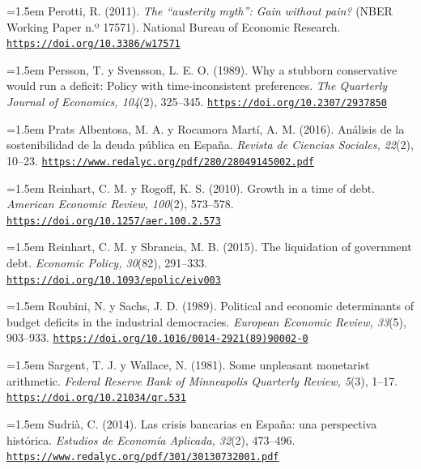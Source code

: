 \documentclass[10pt,a4paper]{article}
\begin{document}
\noindent\hangindent=1.5em Perotti, R. (2011). \textit{The ``austerity myth'': Gain without pain?} (NBER Working Paper n.º 17571). National Bureau of Economic Research. \href{https://doi.org/10.3386/w17571}{\nolinkurl{https://doi.org/10.3386/w17571}}

\noindent\hangindent=1.5em Persson, T. y Svensson, L. E. O. (1989). Why a stubborn conservative would run a deficit: Policy with time-inconsistent preferences. \textit{The Quarterly Journal of Economics, 104}(2), 325--345. \href{https://doi.org/10.2307/2937850}{\nolinkurl{https://doi.org/10.2307/2937850}}

\noindent\hangindent=1.5em Prats Albentosa, M. A. y Rocamora Martí, A. M. (2016). Análisis de la sostenibilidad de la deuda pública en España. \textit{Revista de Ciencias Sociales, 22}(2), 10--23. \href{https://www.redalyc.org/pdf/280/28049145002.pdf}{\nolinkurl{https://www.redalyc.org/pdf/280/28049145002.pdf}}

\noindent\hangindent=1.5em Reinhart, C. M. y Rogoff, K. S. (2010). Growth in a time of debt. \textit{American Economic Review, 100}(2), 573--578. \href{https://doi.org/10.1257/aer.100.2.573}{\nolinkurl{https://doi.org/10.1257/aer.100.2.573}}

\noindent\hangindent=1.5em Reinhart, C. M. y Sbrancia, M. B. (2015). The liquidation of government debt. \textit{Economic Policy, 30}(82), 291--333. \href{https://doi.org/10.1093/epolic/eiv003}{\nolinkurl{https://doi.org/10.1093/epolic/eiv003}}

\noindent\hangindent=1.5em Roubini, N. y Sachs, J. D. (1989). Political and economic determinants of budget deficits in the industrial democracies. \textit{European Economic Review, 33}(5), 903--933. \href{https://doi.org/10.1016/0014-2921(89)90002-0}{\nolinkurl{https://doi.org/10.1016/0014-2921(89)90002-0}}

\noindent\hangindent=1.5em Sargent, T. J. y Wallace, N. (1981). Some unpleasant monetarist arithmetic. \textit{Federal Reserve Bank of Minneapolis Quarterly Review, 5}(3), 1--17. \href{https://doi.org/10.21034/qr.531}{\nolinkurl{https://doi.org/10.21034/qr.531}}

\noindent\hangindent=1.5em Sudrià, C. (2014). Las crisis bancarias en España: una perspectiva histórica. \textit{Estudios de Economía Aplicada, 32}(2), 473--496. \href{https://www.redalyc.org/pdf/301/30130732001.pdf}{\nolinkurl{https://www.redalyc.org/pdf/301/30130732001.pdf}}
\end{document}
